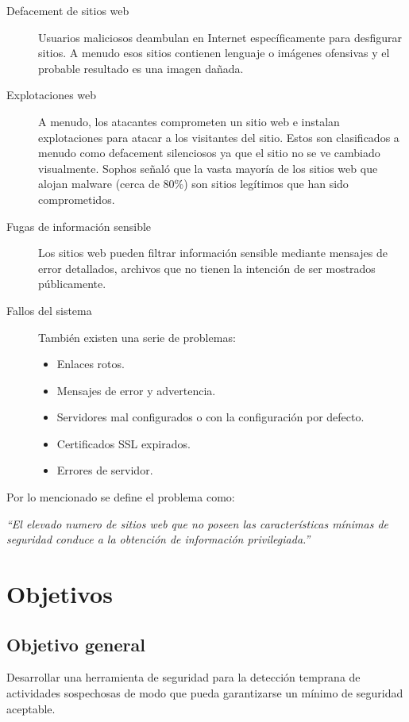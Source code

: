 \documentclass[letter,twoside,11pt]{article}
\begin{document}
\begin{description}
    \item [Defacement de sitios web] Usuarios maliciosos deambulan en Internet
        específicamente para desfigurar sitios. A menudo esos sitios contienen
        lenguaje o imágenes ofensivas y el probable resultado es una imagen
        dañada.
    \item [Explotaciones web] A menudo, los atacantes comprometen un sitio web e
        instalan explotaciones para atacar a los visitantes del sitio. Estos son
        clasificados a menudo como defacement silenciosos ya que el sitio no se
        ve cambiado visualmente. Sophos señaló que la vasta mayoría de los
        sitios web que alojan malware (cerca de 80\%) son sitios legítimos que
        han sido comprometidos.
    \item [Fugas de información sensible] Los sitios web pueden filtrar
        información sensible mediante mensajes de error detallados, archivos que
        no tienen la intención de ser mostrados públicamente.
    \item [Fallos del sistema] También existen una serie de problemas:
        \begin{itemize}
        \item Enlaces rotos.
        \item Mensajes de error y advertencia.
        \item Servidores mal configurados o con la configuración por defecto.
        \item Certificados SSL expirados.
        \item Errores de servidor.
        \end{itemize}
\end{description}

Por lo mencionado se define el problema como:

\emph{“El elevado numero de sitios web que no poseen las características mínimas
de seguridad conduce a la obtención de información privilegiada.”}

\section{Objetivos}

\subsection{Objetivo general}

Desarrollar una herramienta de seguridad para la detección temprana de
actividades sospechosas de modo que pueda garantizarse un mínimo de seguridad
aceptable.
\end{document}
